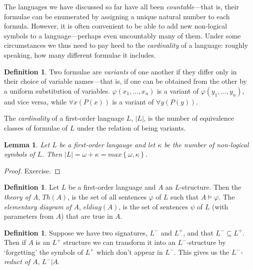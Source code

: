 \documentclass[10pt, a4paper, oneside]{article}
\theoremstyle{definition}
\newtheorem{dfn}[thm]{Definition}
\theoremstyle{remark}
\theoremstyle{plain}
\newtheorem{lem}[thm]{Lemma}
\theoremstyle{plain}
\begin{document}
The languages we have discussed so far have all been \emph{countable}---that is,
their formulae can be enumerated by assigning a unique natural number to each
formula. However, it is often convenient to be able to add new non-logical
symbols to a language---perhaps even uncountably many of them. Under some
circumstances we thus need to pay heed to the \emph{cardinality} of a language:
roughly speaking, how many different formulae it includes.

\begin{dfn}
    Two formulae are \emph{variants} of one another if they differ only in their
    choice of variable names---that is, if one can be obtained from the other by
    a uniform substitution of variables. $\varphi(x_1, \dotsc, x_n)$ is a
    variant of $\varphi(y_1, \dotsc, y_n)$, and vice versa, while
    $\forall{x} (P(x))$ is a variant of $\forall{y} (P(y))$.
    
    The \emph{cardinality} of a first-order language $L$, $|L|$, is the number
    of equivalence classes of formulae of $L$ under the relation of being
    variants.
\end{dfn}

\begin{lem}
    Let $L$ be a first-order langauge and let $\kappa$ be the number of
    non-logical symbols of $L$. Then $|L| = \omega + \kappa =
    max \left\{ \omega, \kappa \right\}$.
\end{lem}

\begin{proof}
    Exercise.
\end{proof}

\begin{dfn}
    Let $L$ be a first-order language and $A$ an $L$-structure. Then the
    \emph{theory of $A$}, $Th(A)$, is the set of all sentences $\varphi$ of $L$
    such that $A \models \varphi$. The \emph{elementary diagram of $A$},
    $eldiag(A)$, is the set of sentences $\psi$ of $L$ (with parameters from
    $A$) that are true in $A$.
\end{dfn}

\begin{dfn}
    Suppose we have two signatures, $L^-$ and $L^+$, and that $L^- \subseteq
    L^+$. Then if $A$ is an $L^+$ structure we can transform it into an
    $L^-$-structure by `forgetting' the symbols of $L^+$ which don't appear in
    $L^-$. This gives us the \emph{$L^-$-reduct of $A$}, $L^- | A$.
\end{dfn}
\end{document}
